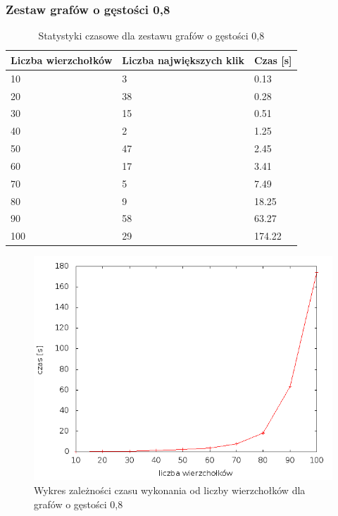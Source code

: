 \documentclass[12pt, a4paper]{article}
\begin{document}
\subsubsection*{Zestaw grafów o gęstości 0,8}
\begin{table}[H]
\caption{Statystyki czasowe dla zestawu grafów o gęstości 0,8}
\begin{center}
    \begin{tabular}{|l|l|l|}
    \hline
    Liczba wierzchołków & Liczba największych klik & Czas [s] \\ \hline
    10 & 3 & 0.13 \\ \hline
    20 & 38 & 0.28 \\ \hline
    30 & 15 & 0.51 \\ \hline
    40 & 2 & 1.25 \\ \hline
    50 & 47 & 2.45 \\ \hline
    60 & 17 & 3.41 \\ \hline
    70 & 5 & 7.49 \\ \hline
    80 & 9 & 18.25 \\ \hline
    90 & 58 & 63.27 \\ \hline
    100 & 29 & 174.22 \\ \hline
    \end{tabular}
\end{center}
\end{table}

\begin{figure}[h]
    \begin{center}
	\includegraphics[scale=0.5]{results/img/den/den_08.png}
	\caption{Wykres zależności czasu wykonania od liczby wierzchołków dla grafów o gęstości 0,8}
    \end{center}
\end{figure}
\end{document}
